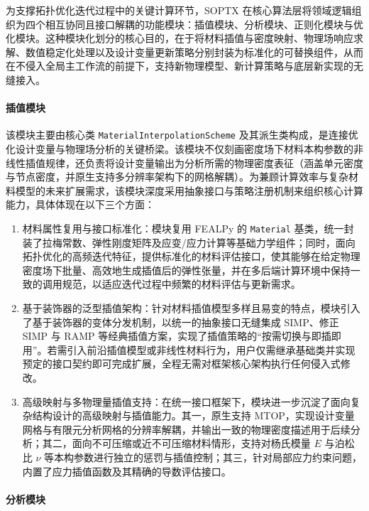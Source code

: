 为支撑拓扑优化迭代过程中的关键计算环节，SOPTX 在核心算法层将领域逻辑组织为四个相互协同且接口解耦的功能模块：插值模块、分析模块、正则化模块与优化模块。这种模块化划分的核心目的，在于将材料插值与密度映射、物理场响应求解、数值稳定化处理以及设计变量更新策略分别封装为标准化的可替换组件，从而在不侵入全局主工作流的前提下，支持新物理模型、新计算策略与底层新实现的无缝接入。

\paragraph*{插值模块}

该模块主要由核心类 \texttt{MaterialInterpolationScheme} 及其派生类构成，是连接优化设计变量与物理场分析的关键桥梁。该模块不仅刻画密度场下材料本构参数的非线性插值规律，还负责将设计变量输出为分析所需的物理密度表征（涵盖单元密度与节点密度，并原生支持多分辨率架构下的网格解耦）。为兼顾计算效率与复杂材料模型的未来扩展需求，该模块深度采用抽象接口与策略注册机制来组织核心计算能力，具体体现在以下三个方面：
\begin{enumerate}[
	label={（\arabic*）},
	labelsep=0.25em,
	leftmargin=3.2em,
	itemsep=0.4em,
	topsep=0.4em,
	parsep=0pt,
	partopsep=0pt
	]
	\item 材料属性复用与接口标准化：模块复用 FEALPy 的 \texttt{Material} 基类，统一封装了拉梅常数、弹性刚度矩阵及应变/应力计算等基础力学组件；同时，面向拓扑优化的高频迭代特征，提供标准化的材料评估接口，使其能够在给定物理密度场下批量、高效地生成插值后的弹性张量，并在多后端计算环境中保持一致的调用规范，以适应迭代过程中频繁的材料评估与更新需求。
	
	\item 基于装饰器的泛型插值架构：针对材料插值模型多样且易变的特点，模块引入了基于装饰器的变体分发机制，以统一的抽象接口无缝集成 SIMP、修正 SIMP 与 RAMP 等经典插值方案，实现了插值策略的“按需切换与即插即用”。若需引入前沿插值模型或非线性材料行为，用户仅需继承基础类并实现预定的接口契约即可完成扩展，全程无需对框架核心架构执行任何侵入式修改。

	\item 高级映射与多物理量插值支持：在统一接口框架下，模块进一步沉淀了面向复杂结构设计的高级映射与插值能力。其一，原生支持 MTOP，实现设计变量网格与有限元分析网格的分辨率解耦，并输出一致的物理密度描述用于后续分析；其二，面向不可压缩或近不可压缩材料情形，支持对杨氏模量 $E$ 与泊松比 $\nu$ 等本构参数进行独立的惩罚与插值控制；其三，针对局部应力约束问题，内置了应力插值函数及其精确的导数评估接口。
\end{enumerate}

\paragraph*{分析模块}

